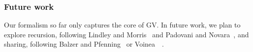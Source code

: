 \subsubsection*{Future work}
Our formalism so far only captures the core of GV. In future work, we plan to explore recursion, following Lindley and Morris~\cite{lindleymorris16} and Padovani and Novara~\cite{padovaninovara15}, and sharing, following Balzer and Pfenning~\cite{balzerpfenning17} or Voinea~\etal~\cite{VoineaDG19}.

